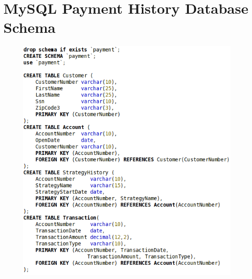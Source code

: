 %
%
\chapter{MySQL Payment History Database Schema} \label{app:mysql}
\begin{figure}[hct]
 \centering
 \includegraphics[scale=0.90]{../images/sql_payment_schema.png}
\end{figure}